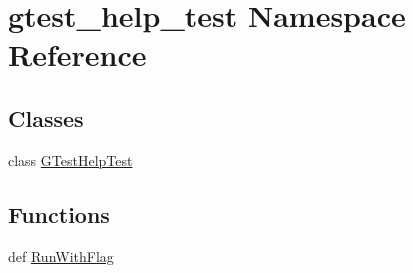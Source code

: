 \hypertarget{namespacegtest__help__test}{\section{gtest\-\_\-help\-\_\-test Namespace Reference}
\label{namespacegtest__help__test}
}
\subsection*{Classes}
\begin{DoxyCompactItemize}
\item 
class \hyperlink{classgtest__help__test_1_1_g_test_help_test}{G\-Test\-Help\-Test}
\end{DoxyCompactItemize}
\subsection*{Functions}
\begin{DoxyCompactItemize}
\item 
def \hyperlink{namespacegtest__help__test_af3afba8549b2e3bb77e59a98995c3f75}{Run\-With\-Flag}
\end{DoxyCompactItemize}
